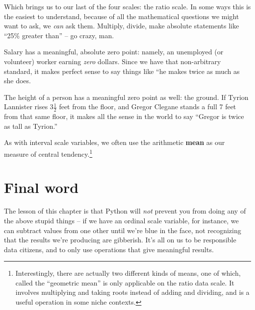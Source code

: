 Which brings us to our last of the four scales: the ratio scale. In some ways
this is the easiest to understand, because of all the mathematical questions
we might want to ask, we \textit{can} ask them. Multiply, divide, make 
absolute statements like ``25\% greater than'' -- go crazy, man.

Salary has a meaningful, absolute zero point: namely, an unemployed (or
volunteer) worker earning \textit{zero} dollars. Since we have that
non-arbitrary standard, it makes perfect sense to say things like ``he makes
twice as much as she does.

The height of a person has a meaningful zero point as well: the ground. If
Tyrion Lannister rises $3\frac{1}{2}$ feet from the floor, and Gregor Clegane
stands a full 7 feet from that same floor, it makes all the sense in the world
to say ``Gregor is twice as tall as Tyrion.''

As with interval scale variables, we often use the arithmetic \textbf{mean}  as
our measure of central tendency.\footnote{Interestingly, there are actually two
different kinds of means, one of which, called the ``geometric mean'' is only
applicable on the ratio data scale. It involves multiplying and taking roots
instead of adding and dividing, and is a useful operation in some niche
contexts.}

\section{Final word}
The lesson of this chapter is that Python will \textit{not} prevent you from
doing any of the above stupid things -- if we have an ordinal scale variable,
for instance, we can subtract values from one other until we're blue in the
face, not recognizing that the results we're producing are gibberish. It's all
on us to be responsible data citizens, and to only use operations that give
meaningful results.
